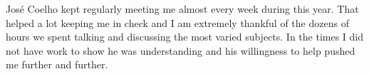 José Coelho kept regularly meeting me almost every week during this year. That helped a lot keeping me in check and I am extremely thankful of the dozens of hours we spent talking and discussing the most varied subjects. In the times I did not have work to show he was understanding and his willingness to help pushed me further and further.











